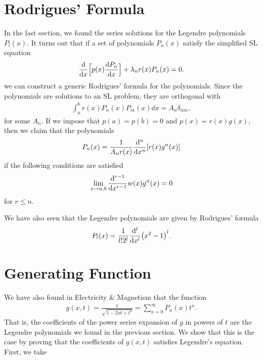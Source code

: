 \section{Rodrigues' Formula}

In the last section, we found the series solutions for the Legendre polynomials $P_{l}(x)$.
It turns out that if a set of polynomials $P_{n}(x)$ satisfy the simplified SL equation
\begin{eqnarray}
    \dv{x} \Big[ p(x) \dv{P_{n}}{x} \Big] + \lambda_{n} r(x) P_{n}(x) = 0
.\end{eqnarray}
we can construct a generic Rodrigues' formula for the polynomials.
Since the polynomials are solutions to an SL problem, they are orthogonal with
\begin{eqnarray}
    \int_{a}^{b} r(x) P_{n}(x) P_{m}(x) \dd{x} = A_{n} \delta_{nm}
,\end{eqnarray}
for some $A_{n}$.
If we impose that $p(a) = p(b) = 0$ and $p(x) = r(x) g(x)$, then we claim that the polynomials
\begin{eqnarray}
    P_{n}(x) = \frac{1}{A_{n} r(x)} \dv[n]{x} [r(x) g^{n}(x)]
\end{eqnarray}
if the following conditions are satisfied
\begin{eqnarray}
    \lim_{x \rightarrow a,b} \dv[r-1]{x} w(x) g^{n}(x) = 0
\end{eqnarray}
for $r \leq n$.

We have also seen that the Legendre polynomials are given by Rodrigues' formula
\begin{eqnarray}
    P_{l}(x) = \frac{1}{l! 2^{l}} \dv[l]{x} (x^2 - 1)^{l}
.\end{eqnarray}


\section{Generating Function}

We have also found in Electricity \& Magnetism that the function
\begin{eqnarray}
    g(x,t) = \frac{1}{\sqrt{1 - 2xt + t^2}} = \sum_{n=0}^{\infty} P_{n}(x) t^{n}
.\end{eqnarray}
That is, the coefficients of the power series expansion of $g$ in powers of $t$ are the Legendre polynomials we found in the previous section.
We show that this is the case by proving that the coefficients of $g(x,t)$ satisfies Legendre's equation.
First, we take 








